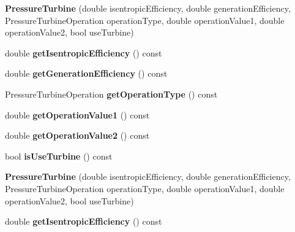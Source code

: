 \begin{DoxyCompactItemize}
\mbox{\label{class_pressure_turbine_a73df3943891acc547e642956597e3fe0}} 
{\bfseries Pressure\+Turbine} (double isentropic\+Efficiency, double generation\+Efficiency, Pressure\+Turbine\+Operation operation\+Type, double operation\+Value1, double operation\+Value2, bool use\+Turbine)
\item 
\mbox{\label{class_pressure_turbine_a15ed3b71b89861792f29dd6c1c1d704c}} 
double {\bfseries get\+Isentropic\+Efficiency} () const
\item 
\mbox{\label{class_pressure_turbine_a0c1411ac58d31f57e0aec8f80d73c39f}} 
double {\bfseries get\+Generation\+Efficiency} () const
\item 
\mbox{\label{class_pressure_turbine_a4618372da7c53adbececfc476c6775b0}} 
Pressure\+Turbine\+Operation {\bfseries get\+Operation\+Type} () const
\item 
\mbox{\label{class_pressure_turbine_a95e1c8725ad8035549baf8877343d3d9}} 
double {\bfseries get\+Operation\+Value1} () const
\item 
\mbox{\label{class_pressure_turbine_aee57986c0c741d5b1df72fb00f480a56}} 
double {\bfseries get\+Operation\+Value2} () const
\item 
\mbox{\label{class_pressure_turbine_ac8064c2c5c1b5acd7846a3a8036ef0bb}} 
bool {\bfseries is\+Use\+Turbine} () const
\item 
\mbox{\label{class_pressure_turbine_a73df3943891acc547e642956597e3fe0}} 
{\bfseries Pressure\+Turbine} (double isentropic\+Efficiency, double generation\+Efficiency, Pressure\+Turbine\+Operation operation\+Type, double operation\+Value1, double operation\+Value2, bool use\+Turbine)
\item 
\mbox{\label{class_pressure_turbine_a15ed3b71b89861792f29dd6c1c1d704c}} 
double {\bfseries get\+Isentropic\+Efficiency} () const
\item 
\mbox{\label{class_pressure_turbine_a0c1411ac58d31f57e0aec8f80d73c39f}} 

\end{DoxyCompactItemize}
